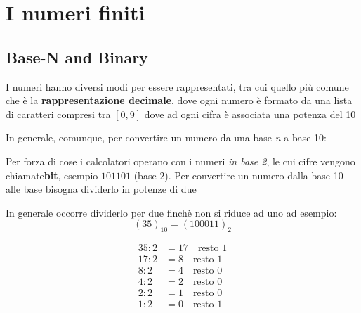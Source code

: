 \chapter{I numeri finiti}
\section{Base-N and Binary}

I numeri hanno diversi modi per essere rappresentati, tra cui quello più comune che è la \textbf{rappresentazione decimale}, dove ogni numero è formato da una lista di caratteri compresi tra $[0,9]$ dove ad ogni cifra è associata una potenza del 10
\\

In generale, comunque, per convertire un numero da una base \textit{n} a base 10:

Per forza di cose i calcolatori operano con i numeri \textit{in base 2}, le cui cifre vengono chiamate\textbf{bit}, esempio $101101$ (base 2).
Per convertire un numero dalla base 10 alle base bisogna dividerlo in potenze di due 
\esempio{
    \[
        37 \, (\text{base } 10) = 32 + 4 + 1 = 1 \cdot 2^5 + 0 \cdot 2^4 + 0 \cdot 2^3 + 1 \cdot 2^2 + 0 \cdot 2^1 + 1 \cdot 2^0 = 100101 \, (\text{base } 2)
    \]
}

In generale occorre dividerlo per due finchè non si riduce ad uno ad esempio: 
\[
(35)_{10} = (100011)_2
\]

\begin{align*}
    35 : 2 &= 17 \quad \text{resto } 1 \\
    17 : 2 &= 8  \quad \text{resto } 1 \\
    8 : 2  &= 4  \quad \text{resto } 0 \\
    4 : 2  &= 2  \quad \text{resto } 0 \\
    2 : 2  &= 1  \quad \text{resto } 0 \\
    1 : 2  &= 0  \quad \text{resto } 1
\end{align*}
    



